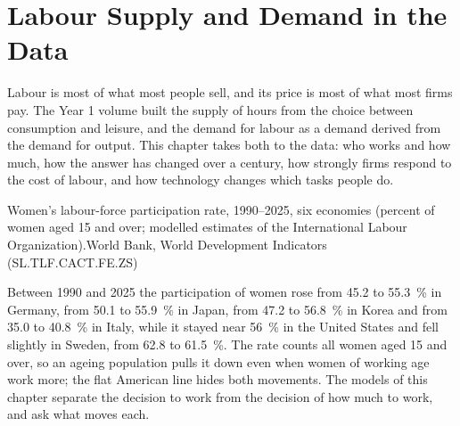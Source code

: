 \chapter{Labour Supply and Demand in the Data}\label{ch:b3:labour-supply-and-demand}

Labour is most of what most people sell, and its price is most of what most firms
pay. The Year 1 volume built the supply of hours from the choice between
consumption and leisure, and the demand for labour as a demand derived from the
demand for output. This chapter takes both to the data: who works and how much,
how the answer has changed over a century, how strongly firms respond to the cost
of labour, and how technology changes which tasks people do.

\begin{openingchart}{Women's labour-force participation rate, 1990--2025, six economies
(percent of women aged 15 and over; modelled estimates of the International Labour
Organization).}{World Bank, World Development Indicators (SL.TLF.CACT.FE.ZS)}
\end{openingchart}

Between 1990 and 2025 the participation of women rose from 45.2 to 55.3~\% in Germany, from
50.1 to 55.9~\% in Japan, from 47.2 to 56.8~\% in Korea and from 35.0 to 40.8~\% in Italy, while it
stayed near 56~\% in the United States and fell slightly in Sweden, from 62.8 to 61.5~\%. The
rate counts all women aged 15 and over, so an ageing population pulls it down even
when women of working age work more; the flat American line hides both movements.
The models of this chapter separate the decision to work from the decision of how
much to work, and ask what moves each.

